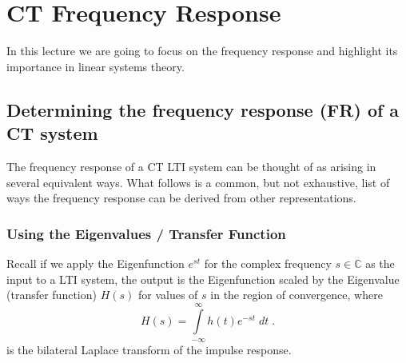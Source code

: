 \chapter{CT Frequency Response}

In this lecture we are going to focus on the frequency response and highlight its importance in linear systems theory.

\section{Determining the frequency response (FR) of a CT system}

The frequency response of a CT LTI system can be thought of as arising in several equivalent ways. What follows is a common, but not exhaustive, list of ways the frequency response can be derived from other representations.

\subsection*{Using the Eigenvalues / Transfer Function}

Recall if we apply the Eigenfunction $e^{st}$ for the complex frequency $s \in \mathbb{C}$ as the input to a LTI system, the output is the Eigenfunction scaled by the Eigenvalue (transfer function) $H(s)$ for values of $s$ in the region of convergence, where
\[
H(s) = \int\limits_{-\infty}^{\infty} h(t) e^{-st}\; dt \; .
\]
is the bilateral Laplace transform of the impulse response.

